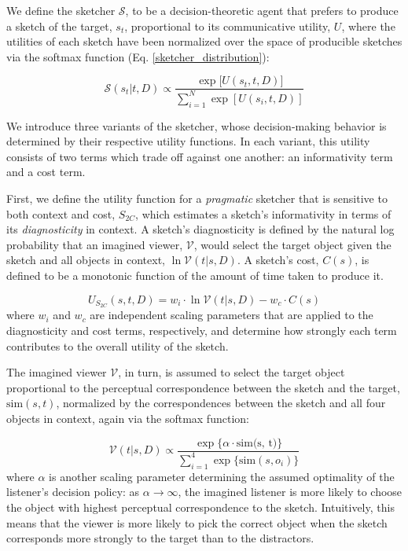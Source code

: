 \documentclass[9pt,twocolumn,twoside]{pnas-new}
\begin{document}
We define the sketcher $\mathcal{S}$, to be a decision-theoretic agent that prefers to produce a sketch of the target, $s_t$, proportional to its communicative utility, $U$, where the utilities of each sketch have been normalized over the space of producible sketches via the softmax function (Eq. \ref{sketcher_distribution}):

\begin{equation} \label{sketcher_distribution}
\mathcal{S}(s_t|t, D) \propto \frac {\exp [{U(s_t,t,D)]}} {\sum_{i=1}^{N} {\exp [U(s_i,t,D)]}}
\end{equation}

We introduce three variants of the sketcher, whose decision-making behavior is determined by their respective utility functions. 
In each variant, this utility consists of two terms which trade off against one another: an informativity term and a cost term. 

First, we define the utility function for a \textit{pragmatic} sketcher that is sensitive to both context and cost, $S_{2C}$, which estimates a sketch's informativity in terms of its \textit{diagnosticity} in context. 
A sketch's diagnosticity is defined by the natural log probability that an imagined viewer, $\mathcal{V}$, would select the target object given the sketch and all objects in context, $\ln \mathcal{V}(t|s,D)$. 
A sketch's cost, $C(s)$, is defined to be a monotonic function of the amount of time taken to produce it. 

\begin{equation} \label{sketcher_utility}
U_{S_{2C}}(s,t,D) = w_i \cdot \ln \mathcal{V}(t|s,D) - w_c \cdot  C(s)
\end{equation}
where $w_i$ and $w_c$ are independent scaling parameters that are applied to the diagnosticity and cost terms, respectively, and determine how strongly each term contributes to the overall utility of the sketch. 

The imagined viewer $\mathcal{V}$, in turn, is assumed to select the target object proportional to the perceptual correspondence between the sketch and the target, $\textrm{sim}(s,t)$, normalized by the correspondences between the sketch and all four objects in context, again via the softmax function:

\begin{equation} \label{literal_viewer_score}
\mathcal{V}(t|s,D) \propto \frac {\exp\{\alpha \cdot \textrm{sim(s, t)}\}} {\sum_{i=1}^{4} \exp\{\textrm{sim}(s,o_i)\}}
\end{equation}
where $\alpha$ is another scaling parameter determining the assumed optimality of the listener's decision policy: as $\alpha \rightarrow \infty$, the imagined listener is more likely to choose the object with highest perceptual correspondence to the sketch. Intuitively, this means that the viewer is more likely to pick the correct object when the sketch corresponds more strongly to the target than to the distractors. 
\end{document}
